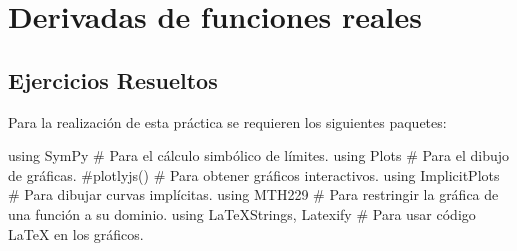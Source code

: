 \documentclass[
  a4paper,
]{scrreport}
\newenvironment{Shaded}{\begin{snugshade}}{\end{snugshade}}
\newcommand{\BuiltInTok}[1]{\textcolor[rgb]{0.00,0.23,0.31}{#1}}
\newcommand{\CommentTok}[1]{\textcolor[rgb]{0.37,0.37,0.37}{#1}}
\newcommand{\ImportTok}[1]{\textcolor[rgb]{0.00,0.46,0.62}{#1}}
\newcommand{\NormalTok}[1]{\textcolor[rgb]{0.00,0.23,0.31}{#1}}
\theoremstyle{definition}
\theoremstyle{remark}
\begin{document}

\hypertarget{derivadas-de-funciones-reales}{%
\chapter{Derivadas de funciones
reales}\label{derivadas-de-funciones-reales}}

\hypertarget{ejercicios-resueltos-3}{%
\section{Ejercicios Resueltos}\label{ejercicios-resueltos-3}}

Para la realización de esta práctica se requieren los siguientes
paquetes:

\begin{Shaded}
\begin{Highlighting}[]
\ImportTok{using} \BuiltInTok{SymPy  }\CommentTok{\# Para el cálculo simbólico de límites.}
\ImportTok{using} \BuiltInTok{Plots  }\CommentTok{\# Para el dibujo de gráficas.}
\CommentTok{\#plotlyjs() \# Para obtener gráficos interactivos.}
\ImportTok{using} \BuiltInTok{ImplicitPlots }\CommentTok{\# Para dibujar curvas implícitas.}
\ImportTok{using} \BuiltInTok{MTH229 }\CommentTok{\# Para restringir la gráfica de una función a su dominio.}
\ImportTok{using} \BuiltInTok{LaTeXStrings}\NormalTok{, }\BuiltInTok{Latexify  }\CommentTok{\# Para usar código LaTeX en los gráficos.}
\end{Highlighting}
\end{Shaded}
\end{document}

